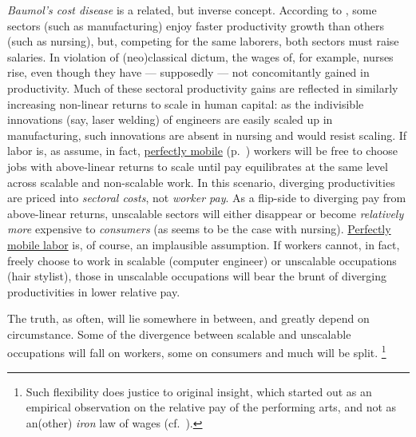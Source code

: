 \begin{enumerate}
	\emph{Baumol's cost disease} is a related, but inverse concept.
	According to \cite{Baumol1965}, some sectors (such as  manufacturing) enjoy faster productivity growth than others (such as nursing), but, competing for the same laborers, both sectors must raise salaries.
	In violation of (neo)classical dictum, the wages of, for example, nurses rise, even though they have --- supposedly --- not concomitantly gained in productivity.
	Much of these sectoral productivity gains are reflected in similarly increasing non-linear returns to scale in human capital:
	as the indivisible innovations (say, laser welding) of engineers are easily scaled up in manufacturing, such innovations are absent in nursing and would resist scaling.
	If labor is, as \cite{Baumol1965} assume, in fact, \hyperref[itm:perfect-factor-mobility]{perfectly mobile} (p.~\pageref{sec:perfect-competition}) workers will be free to choose jobs with above-linear returns to scale until pay equilibrates at the same level across scalable and non-scalable work.
	In this scenario, diverging productivities are priced into \emph{sectoral costs}, not \emph{worker pay}.
	As a flip-side to diverging pay from above-linear returns, unscalable sectors will either disappear or become \emph{relatively more} expensive to \emph{consumers} (as seems to be the case with nursing).
	\hyperref[itm:perfect-factor-mobility]{Perfectly mobile labor} is, of course, an implausible assumption.
	If workers cannot, in fact, freely choose to work in scalable (computer engineer) or unscalable occupations (hair stylist), those in unscalable occupations will bear the brunt of diverging productivities in lower relative pay.

	The truth, as often, will lie somewhere in between, and greatly depend on circumstance.
	Some of the divergence between scalable and unscalable occupations will fall on workers, some on consumers and much will be split.
	\footnote{
	Such flexibility does justice to \cite{Baumol1965} original insight, which started out as an empirical observation on the relative pay of the performing arts, and not as an(other) \emph{iron} law of wages (cf.~\citealt{Malthus1798}).
	}


\end{enumerate}
